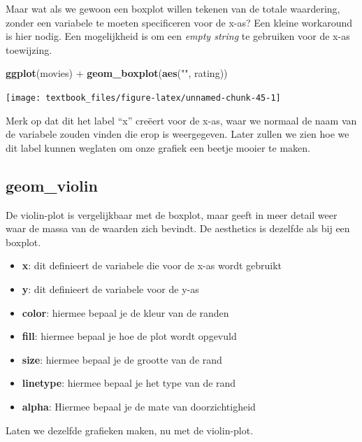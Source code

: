 \documentclass[]{tufte-book}
\newenvironment{Shaded}{}{}
\newcommand{\KeywordTok}[1]{\textcolor[rgb]{0.00,0.44,0.13}{\textbf{#1}}}
\newcommand{\NormalTok}[1]{#1}
\newcommand{\OperatorTok}[1]{\textcolor[rgb]{0.40,0.40,0.40}{#1}}
\newcommand{\StringTok}[1]{\textcolor[rgb]{0.25,0.44,0.63}{#1}}
\providecommand{\tightlist}{%
  \setlength{\itemsep}{0pt}\setlength{\parskip}{0pt}}
\begin{document}
Maar wat als we gewoon een boxplot willen tekenen van de totale waardering, zonder een variabele te moeten specificeren voor de x-as? Een kleine workaround is hier nodig. Een mogelijkheid is om een \emph{empty string} te gebruiken voor de x-as toewijzing.

\begin{Shaded}
\begin{Highlighting}[]
\KeywordTok{ggplot}\NormalTok{(movies) }\OperatorTok{+}
\StringTok{    }\KeywordTok{geom_boxplot}\NormalTok{(}\KeywordTok{aes}\NormalTok{(}\StringTok{""}\NormalTok{, rating))}
\end{Highlighting}
\end{Shaded}

\texttt{[image: textbook\_files/figure-latex/unnamed-chunk-45-1]}

Merk op dat dit het label ``x'' creëert voor de x-as, waar we normaal de naam van de variabele zouden vinden die erop is weergegeven. Later zullen we zien hoe we dit label kunnen weglaten om onze grafiek een beetje mooier te maken.

\hypertarget{geom_violin}{%
\subsection{geom\_violin}\label{geom_violin}}

De violin-plot is vergelijkbaar met de boxplot, maar geeft in meer detail weer waar de massa van de waarden zich bevindt. De aesthetics is dezelfde als bij een boxplot.

\begin{itemize}
\tightlist
\item
  \textbf{x}: dit definieert de variabele die voor de x-as wordt gebruikt
\item
  \textbf{y}: dit definieert de variabele voor de y-as
\item
  \textbf{color}: hiermee bepaal je de kleur van de randen
\item
  \textbf{fill}: hiermee bepaal je hoe de plot wordt opgevuld
\item
  \textbf{size}: hiermee bepaal je de grootte van de rand
\item
  \textbf{linetype}: hiermee bepaal je het type van de rand
\item
  \textbf{alpha}: Hiermee bepaal je de mate van doorzichtigheid
\end{itemize}

Laten we dezelfde grafieken maken, nu met de violin-plot.
\end{document}
